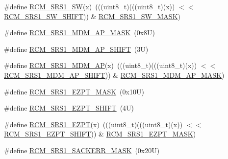\begin{DoxyCompactItemize}
\item 
\#define \mbox{\hyperlink{group___r_c_m___register___masks_ga36b91894a31fac3176c85c742e21fda3}{R\+C\+M\+\_\+\+S\+R\+S1\+\_\+\+SW}}(x)~(((uint8\+\_\+t)(((uint8\+\_\+t)(x)) $<$$<$ \mbox{\hyperlink{group___r_c_m___register___masks_ga7e554c1ae96dae684fbc81204283f86c}{R\+C\+M\+\_\+\+S\+R\+S1\+\_\+\+S\+W\+\_\+\+S\+H\+I\+FT}})) \& \mbox{\hyperlink{group___r_c_m___register___masks_ga72f541acd2a0992ad0d1d089c694ad5f}{R\+C\+M\+\_\+\+S\+R\+S1\+\_\+\+S\+W\+\_\+\+M\+A\+SK}})
\item 
\#define \mbox{\hyperlink{group___r_c_m___register___masks_ga6af4d8ed2135b602de575373f22b1af8}{R\+C\+M\+\_\+\+S\+R\+S1\+\_\+\+M\+D\+M\+\_\+\+A\+P\+\_\+\+M\+A\+SK}}~(0x8\+U)
\item 
\#define \mbox{\hyperlink{group___r_c_m___register___masks_ga91611da7546b27a939e92926f378229f}{R\+C\+M\+\_\+\+S\+R\+S1\+\_\+\+M\+D\+M\+\_\+\+A\+P\+\_\+\+S\+H\+I\+FT}}~(3\+U)
\item 
\#define \mbox{\hyperlink{group___r_c_m___register___masks_ga2e9238a5208d08d3f22f20dc0e512629}{R\+C\+M\+\_\+\+S\+R\+S1\+\_\+\+M\+D\+M\+\_\+\+AP}}(x)~(((uint8\+\_\+t)(((uint8\+\_\+t)(x)) $<$$<$ \mbox{\hyperlink{group___r_c_m___register___masks_ga91611da7546b27a939e92926f378229f}{R\+C\+M\+\_\+\+S\+R\+S1\+\_\+\+M\+D\+M\+\_\+\+A\+P\+\_\+\+S\+H\+I\+FT}})) \& \mbox{\hyperlink{group___r_c_m___register___masks_ga6af4d8ed2135b602de575373f22b1af8}{R\+C\+M\+\_\+\+S\+R\+S1\+\_\+\+M\+D\+M\+\_\+\+A\+P\+\_\+\+M\+A\+SK}})
\item 
\#define \mbox{\hyperlink{group___r_c_m___register___masks_gaaff7d7a53676535a98915b174b862435}{R\+C\+M\+\_\+\+S\+R\+S1\+\_\+\+E\+Z\+P\+T\+\_\+\+M\+A\+SK}}~(0x10\+U)
\item 
\#define \mbox{\hyperlink{group___r_c_m___register___masks_ga709ca27033c866f17c9e80ccf6df88b6}{R\+C\+M\+\_\+\+S\+R\+S1\+\_\+\+E\+Z\+P\+T\+\_\+\+S\+H\+I\+FT}}~(4\+U)
\item 
\#define \mbox{\hyperlink{group___r_c_m___register___masks_ga3923db948feecbb98cf1a34558b55cfd}{R\+C\+M\+\_\+\+S\+R\+S1\+\_\+\+E\+Z\+PT}}(x)~(((uint8\+\_\+t)(((uint8\+\_\+t)(x)) $<$$<$ \mbox{\hyperlink{group___r_c_m___register___masks_ga709ca27033c866f17c9e80ccf6df88b6}{R\+C\+M\+\_\+\+S\+R\+S1\+\_\+\+E\+Z\+P\+T\+\_\+\+S\+H\+I\+FT}})) \& \mbox{\hyperlink{group___r_c_m___register___masks_gaaff7d7a53676535a98915b174b862435}{R\+C\+M\+\_\+\+S\+R\+S1\+\_\+\+E\+Z\+P\+T\+\_\+\+M\+A\+SK}})
\item 
\#define \mbox{\hyperlink{group___r_c_m___register___masks_gaa09459c8ed6200a5828221f9d15656d3}{R\+C\+M\+\_\+\+S\+R\+S1\+\_\+\+S\+A\+C\+K\+E\+R\+R\+\_\+\+M\+A\+SK}}~(0x20\+U)
$$
\end{DoxyCompactItemize}
